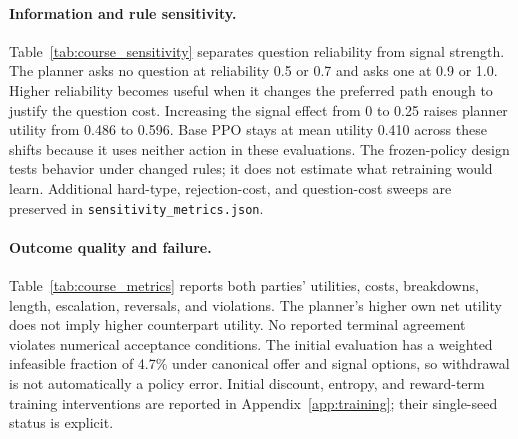 \paragraph{Information and rule sensitivity.}
Table~\ref{tab:course_sensitivity} separates question reliability from signal strength. The planner asks no question at reliability 0.5 or 0.7 and asks one at 0.9 or 1.0. Higher reliability becomes useful when it changes the preferred path enough to justify the question cost. Increasing the signal effect from 0 to 0.25 raises planner utility from 0.486 to 0.596. Base PPO stays at mean utility 0.410 across these shifts because it uses neither action in these evaluations. The frozen-policy design tests behavior under changed rules; it does not estimate what retraining would learn. Additional hard-type, rejection-cost, and question-cost sweeps are preserved in \texttt{sensitivity\_metrics.json}.

\begin{table}[t]
\centering\small
\setlength{\tabcolsep}{3.5pt}

\caption{Additional initial-test metrics, averaged with the same event-group weighting as Table~\ref{tab:policies}A. Own and Other are pre-cost utilities averaged over all outcomes. Break is the breakdown rate, Reverse counts commitment reversals, and Viol. counts bilateral-acceptance violations. Escalation $e$ is a designed rejection index.}
\label{tab:course_metrics}
\end{table}

\paragraph{Outcome quality and failure.}
Table~\ref{tab:course_metrics} reports both parties' utilities, costs, breakdowns, length, escalation, reversals, and violations. The planner's higher own net utility does not imply higher counterpart utility. No reported terminal agreement violates numerical acceptance conditions. The initial evaluation has a weighted infeasible fraction of 4.7\% under canonical offer and signal options, so withdrawal is not automatically a policy error. Initial discount, entropy, and reward-term training interventions are reported in Appendix~\ref{app:training}; their single-seed status is explicit.
